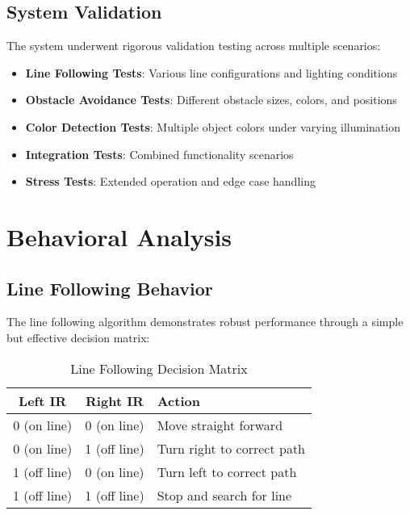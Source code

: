 \documentclass[12pt,a4paper]{article}
\begin{document}
\subsection{System Validation}

The system underwent rigorous validation testing across multiple scenarios:

\begin{itemize}
    \item \textbf{Line Following Tests}: Various line configurations and lighting conditions
    \item \textbf{Obstacle Avoidance Tests}: Different obstacle sizes, colors, and positions
    \item \textbf{Color Detection Tests}: Multiple object colors under varying illumination
    \item \textbf{Integration Tests}: Combined functionality scenarios
    \item \textbf{Stress Tests}: Extended operation and edge case handling
\end{itemize}

\section{Behavioral Analysis}

\subsection{Line Following Behavior}

The line following algorithm demonstrates robust performance through a simple but effective decision matrix:

\begin{table}[H]
\centering
\begin{tabular}{@{}ccl@{}}
\toprule
\textbf{Left IR} & \textbf{Right IR} & \textbf{Action} \\
\midrule
0 (on line) & 0 (on line) & Move straight forward \\
0 (on line) & 1 (off line) & Turn right to correct path \\
1 (off line) & 0 (on line) & Turn left to correct path \\
1 (off line) & 1 (off line) & Stop and search for line \\
\bottomrule
\end{tabular}
\caption{Line Following Decision Matrix}
\label{tab:line_following}
\end{table}
\end{document}
